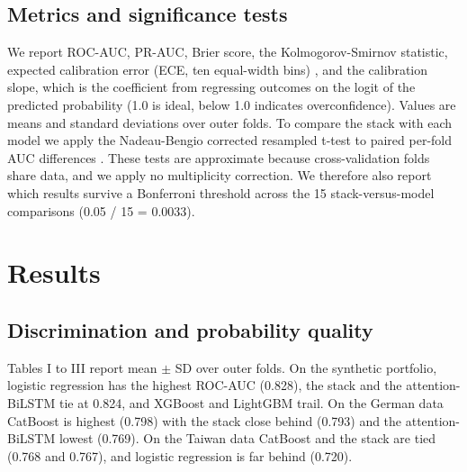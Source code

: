 \documentclass[conference,a4paper]{IEEEtran}
\begin{document}
\subsection{Metrics and significance tests}

We report ROC-AUC, PR-AUC, Brier score, the Kolmogorov-Smirnov statistic, expected calibration error (ECE, ten equal-width bins) \cite{r29}, and the calibration slope, which is the coefficient from regressing outcomes on the logit of the predicted probability (1.0 is ideal, below 1.0 indicates overconfidence). Values are means and standard deviations over outer folds. To compare the stack with each model we apply the Nadeau-Bengio corrected resampled t-test to paired per-fold AUC differences \cite{r25}. These tests are approximate because cross-validation folds share data, and we apply no multiplicity correction. We therefore also report which results survive a Bonferroni threshold across the 15 stack-versus-model comparisons (0.05 / 15 = 0.0033).

\section{Results}

\subsection{Discrimination and probability quality}

Tables I to III report mean $\pm$ SD over outer folds. On the synthetic portfolio, logistic regression has the highest ROC-AUC (0.828), the stack and the attention-BiLSTM tie at 0.824, and XGBoost and LightGBM trail. On the German data CatBoost is highest (0.798) with the stack close behind (0.793) and the attention-BiLSTM lowest (0.769). On the Taiwan data CatBoost and the stack are tied (0.768 and 0.767), and logistic regression is far behind (0.720).
\end{document}
